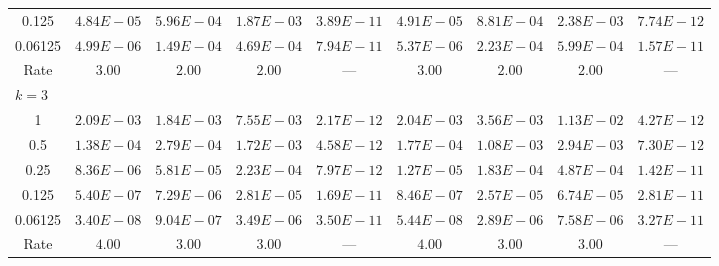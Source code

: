\documentclass[english,11pt,3p,number,sort&compress]{elsarticle}
\begin{document}
\begin{table}[H]
{\begin{tabular}{c c c c c | c c c c}
		0.125   & $4.84E-05$ & $5.96E-04$ & $1.87E-03$ & $3.89E-11$ & $4.91E-05$ & $8.81E-04$ & $2.38E-03$ & $7.74E-12$ \\
		0.06125 & $4.99E-06$ & $1.49E-04$ & $4.69E-04$ & $7.94E-11$ & $5.37E-06$ & $2.23E-04$ & $5.99E-04$ & $1.57E-11$ \\
		Rate & $3.00$ & $2.00$ & $2.00$ & --- & $3.00$ & $2.00$ & $2.00$ & --- \\
		\midrule
		\multicolumn{9}{l}{$k = 3$} \\
		1       & $2.09E-03$ & $1.84E-03$ & $7.55E-03$ & $2.17E-12$ & $2.04E-03$ & $3.56E-03$ & $1.13E-02$ & $4.27E-12$ \\
		0.5     & $1.38E-04$ & $2.79E-04$ & $1.72E-03$ & $4.58E-12$ & $1.77E-04$ & $1.08E-03$ & $2.94E-03$ & $7.30E-12$ \\
		0.25    & $8.36E-06$ & $5.81E-05$ & $2.23E-04$ & $7.97E-12$ & $1.27E-05$ & $1.83E-04$ & $4.87E-04$ & $1.42E-11$ \\
		0.125   & $5.40E-07$ & $7.29E-06$ & $2.81E-05$ & $1.69E-11$ & $8.46E-07$ & $2.57E-05$ & $6.74E-05$ & $2.81E-11$ \\
		0.06125 & $3.40E-08$ & $9.04E-07$ & $3.49E-06$ & $3.50E-11$ & $5.44E-08$ & $2.89E-06$ & $7.58E-06$ & $3.27E-11$ \\
		Rate & $4.00$ & $3.00$ & $3.00$ & --- & $4.00$ & $3.00$ & $3.00$ & --- \\
        \bottomrule
    \end{tabular}}
	\label{tab:bishop-convergence-050}
\end{table}
\end{document}
